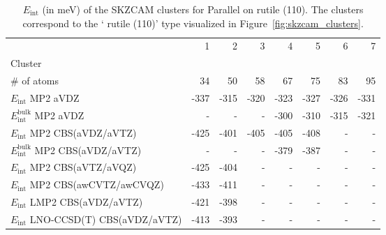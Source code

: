 \begin{table}
\caption{\label{tab:system_eint_r-tio2_co2_parallel}$E_\textrm{int}$ (in meV) of the SKZCAM clusters for Parallel  on  rutile (110). The clusters correspond to the ` rutile (110)' type visualized in Figure~\ref{fig:skzcam_clusters}.}
\begin{adjustbox}{center,max width=1.4\textwidth}
\begin{tabular}{lrrrrrrr}
\toprule
 & 1 & 2 & 3 & 4 & 5 & 6 & 7 \\ 
Cluster &  &  &  &  &  &  &  \\
\midrule
\# of atoms & 34 & 50 & 58 & 67 & 75 & 83 & 95 \\
$E_\textrm{int}$ MP2 aVDZ & -337 & -315 & -320 & -323 & -327 & -326 & -331 \\
$E_\textrm{int}^\textrm{bulk}$ MP2 aVDZ & - & - & - & -300 & -310 & -315 & -321 \\
$E_\textrm{int}$ MP2 CBS(aVDZ/aVTZ) & -425 & -401 & -405 & -405 & -408 & - & - \\
$E_\textrm{int}^\textrm{bulk}$ MP2 CBS(aVDZ/aVTZ) & - & - & - & -379 & -387 & - & - \\
$E_\textrm{int}$ MP2 CBS(aVTZ/aVQZ) & -425 & -404 & - & - & - & - & - \\
$E_\textrm{int}$ MP2 CBS(awCVTZ/awCVQZ) & -433 & -411 & - & - & - & - & - \\
$E_\textrm{int}$ LMP2 CBS(aVDZ/aVTZ) & -421 & -398 & - & - & - & - & - \\
$E_\textrm{int}$ LNO-CCSD(T) CBS(aVDZ/aVTZ) & -413 & -393 & - & - & - & - & - \\
\bottomrule
\end{tabular}
\end{adjustbox}
\end{table}


